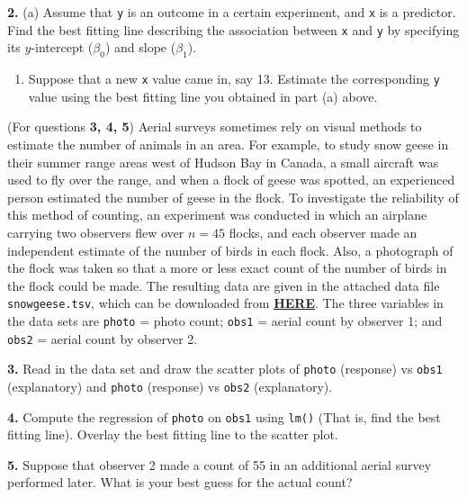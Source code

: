 \documentclass[]{article}
\providecommand{\tightlist}{%
  \setlength{\itemsep}{0pt}\setlength{\parskip}{0pt}}
\begin{document}
\bigskip

\textbf{2.} (a) Assume that \texttt{y} is an outcome in a certain
experiment, and \texttt{x} is a predictor. Find the best fitting line
describing the association between \texttt{x} and \texttt{y} by
specifying its \(y\)-intercept (\(\beta_0\)) and slope (\(\beta_1\)).

\begin{enumerate}
\def\labelenumi{(\alph{enumi})}
\setcounter{enumi}{1}
\tightlist
\item
  Suppose that a new \texttt{x} value came in, say 13. Estimate the
  corresponding \texttt{y} value using the best fitting line you
  obtained in part (a) above.
\end{enumerate}

\bigskip
\bigskip

(For questions \textbf{3, 4, 5}) Aerial surveys sometimes rely on visual
methods to estimate the number of animals in an area. For example, to
study snow geese in their summer range areas west of Hudson Bay in
Canada, a small aircraft was used to fly over the range, and when a
flock of geese was spotted, an experienced person estimated the number
of geese in the flock. To investigate the reliability of this method of
counting, an experiment was conducted in which an airplane carrying two
observers flew over \(n=45\) flocks, and each observer made an
independent estimate of the number of birds in each flock. Also, a
photograph of the flock was taken so that a more or less exact count of
the number of birds in the flock could be made. The resulting data are
given in the attached data file \texttt{snowgeese.tsv}, which can be
downloaded from
\href{https://junglee0713.netlify.com/snowgeese.tsv}{\textbf{HERE}}. The
three variables in the data sets are \texttt{photo} = photo count;
\texttt{obs1} = aerial count by observer 1; and \texttt{obs2} = aerial
count by observer 2.

\textbf{3.} Read in the data set and draw the scatter plots of
\texttt{photo} (response) vs \texttt{obs1} (explanatory) and
\texttt{photo} (response) vs \texttt{obs2} (explanatory).

\bigskip

\textbf{4.} Compute the regression of \texttt{photo} on \texttt{obs1}
using \texttt{lm()} (That is, find the best fitting line). Overlay the
best fitting line to the scatter plot.

\bigskip

\textbf{5.} Suppose that observer 2 made a count of 55 in an additional
aerial survey performed later. What is your best guess for the actual
count?
\end{document}
